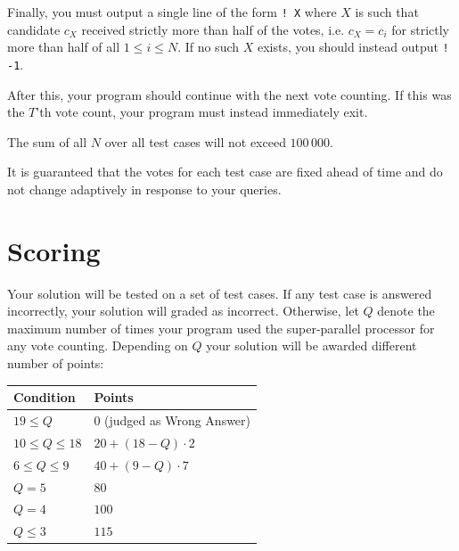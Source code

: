 Finally, you must output a single line of the form \texttt{! X} where $X$ is such that candidate $c_X$ received strictly more than half of the votes, i.e. $c_X = c_i$ for strictly more than half of all $1 \le i \le N$.
If no such $X$ exists, you should instead output \texttt{! -1}.

After this, your program should continue with the next vote counting.
If this was the $T$'th vote count, your program must instead immediately exit.

The sum of all $N$ over all test cases will not exceed $100\,000$.

It is guaranteed that the votes for each test case are fixed ahead of time and do not change adaptively in response to your queries.

\section*{Scoring}
Your solution will be tested on a set of test cases.
If any test case is answered incorrectly, your solution will graded as incorrect.
Otherwise, let $Q$ denote the maximum number of times your program used the super-parallel processor for any vote counting.
Depending on $Q$ your solution will be awarded different number of points:

\begin{center}
\begin{tabular}{|l|l|}
    \hline
    \textbf{Condition} & \textbf{Points} \\ \hline
    $19 \le Q$ & $0$ (judged as Wrong Answer)\\ \hline
    $10 \le Q \le 18$ & $20 + (18 - Q) \cdot 2$ \\ \hline
    $6 \le Q \le 9$ & $40 + (9 - Q) \cdot 7$ \\ \hline
    $Q = 5$ & $80$ \\ \hline
    $Q = 4$ & $100$ \\ \hline
    $Q \le 3$ & $115$ \\ \hline
\end{tabular}
\end{center}
